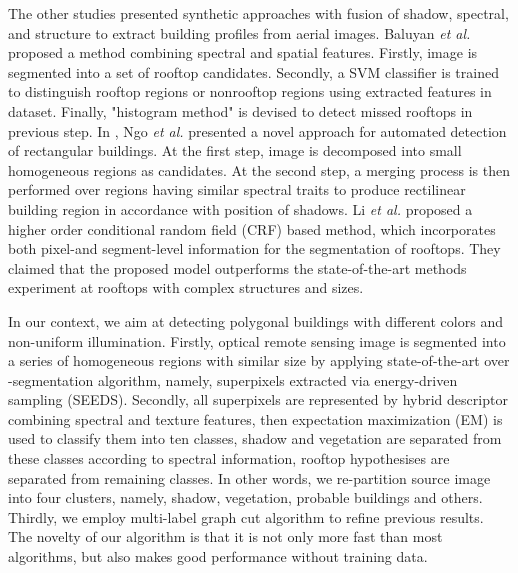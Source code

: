 	The other studies presented synthetic approaches with fusion of shadow, spectral, and structure to extract building profiles from aerial images. Baluyan \textit{et al.} \cite{baluyan2013novel} proposed a method combining spectral and spatial features. Firstly, image is segmented into a set of rooftop candidates. Secondly, a SVM classifier is trained to distinguish rooftop regions or nonrooftop regions using extracted features in dataset. Finally, "histogram method" is devised to detect missed rooftops in previous step. In \cite{ngoautomatic}, Ngo \textit{et al.} presented a novel approach for automated detection of rectangular buildings. At the first step, image is decomposed into small homogeneous regions as candidates. At the second step, a merging process is then performed over regions having similar spectral traits to produce rectilinear building region in accordance with position of shadows. Li \textit{et al.} \cite{li2015robust} proposed a higher order conditional random field (CRF) based method, which incorporates both pixel-and segment-level information for the segmentation of rooftops. They claimed that the proposed model outperforms the state-of-the-art methods experiment at rooftops with complex structures and sizes.
	
   In our context, we aim at detecting polygonal buildings with different colors and  non-uniform illumination. Firstly, optical remote sensing image is segmented into a series of homogeneous regions with similar size by applying state-of-the-art over -segmentation algorithm, namely, superpixels extracted via energy-driven sampling (SEEDS)\cite{van2012seeds}. Secondly, all superpixels are represented by hybrid descriptor combining spectral and texture features, then expectation maximization (EM) is used to classify them into ten classes, shadow and vegetation are separated from these classes according to spectral information, rooftop hypothesises are separated from remaining classes. In other words, we re-partition source image into four clusters, namely, shadow, vegetation, probable buildings and others. Thirdly, we employ multi-label graph cut algorithm to refine previous results. The novelty of our algorithm is that it is not only more fast than most algorithms, but also makes good performance without training data.
   
   
   
   
	
	

